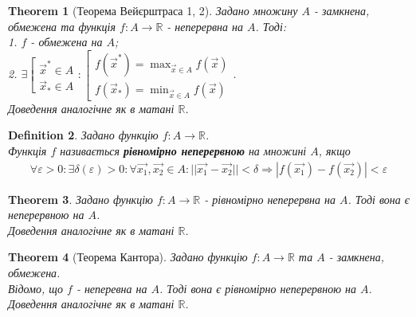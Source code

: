 \documentclass[a4paper, 10pt]{article}
\theoremstyle{theoremdd}
\newtheorem{theorem}{Theorem}[subsection]
\theoremstyle{theoremdd}
\theoremstyle{theoremdd}
\newtheorem{definition}[theorem]{Definition}
\theoremstyle{theoremdd}
\theoremstyle{theoremdd}
\theoremstyle{theoremdd}
\theoremstyle{theoremdd}
\theoremstyle{theoremdd}
\theoremstyle{theoremdd}
\begin{document}
\begin{theorem}[Теорема Вейєрштраса 1, 2]
Задано множину $A$ - замкнена, обмежена та функція $f: A \to \mathbb{R}$ - неперервна на $A$. Тоді:\\
1. $f$ - обмежена на $A$;\\
2. $\exists \left[ \begin{gathered} \vec{x}^* \in A \\ \vec{x}_* \in A \end{gathered} \right. : \left[ \begin{gathered} f(\vec{x}^*) = \max_{\vec{x} \in A} f(\vec{x}) \\ f(\vec{x}_*) = \min_{\vec{x} \in A} f(\vec{x}) \end{gathered} \right.$.\\
\textit{Доведення аналогічне як в матані $\mathbb{R}$.}
\end{theorem}

\begin{definition}
Задано функцію $f: A \to \mathbb{R}$.\\
Функція $f$ називається \textbf{рівномірно неперервною} на множині $A$, якщо
\begin{align*}
\forall \varepsilon > 0: \exists \delta(\varepsilon) > 0: \forall \vec{x_1}, \vec{x_2} \in A: ||\vec{x_1} - \vec{x_2}|| < \delta \Rightarrow |f(\vec{x_1}) - f(\vec{x_2})| < \varepsilon 
\end{align*}
\end{definition}

\begin{theorem}
Задано функцію $f: A \to \mathbb{R}$ - рівномірно неперервна на $A$. Тоді вона є неперервною на $A$.\\
\textit{Доведення аналогічне як в матані $\mathbb{R}$.}
\end{theorem}

\begin{theorem}[Теорема Кантора]
Задано функцію $f: A \to \mathbb{R}$ та $A$ - замкнена, обмежена.\\
Відомо, що $f$ - неперевна на $A$. Тоді вона є рівномірно неперервною на $A$.\\
\textit{Доведення аналогічне як в матані $\mathbb{R}$.}
\end{theorem}
\end{document}

